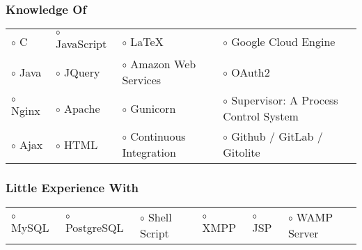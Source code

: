 \documentclass[12pt]{article}
\begin{document}
\subsubsection*{Knowledge Of}

\begin{tabular}{l l l l}
 $\circ$ C &
 $\circ$ JavaScript &
 $\circ$ \LaTeX{} &
 $\circ$ Google Cloud Engine \\
 $\circ$ Java &
 $\circ$ JQuery &
 $\circ$ Amazon Web Services &
 $\circ$ OAuth2 \\
 $\circ$ Nginx &
 $\circ$ Apache &
 $\circ$ Gunicorn &
 $\circ$ Supervisor: A Process Control System \\
 $\circ$ Ajax &
 $\circ$ HTML &
 $\circ$ Continuous Integration &
 $\circ$ Github / GitLab / Gitolite \\
\end{tabular}

\subsubsection*{Little Experience With}

\begin{tabular}{l l l l l l}
 $\circ$ MySQL &
 $\circ$ PostgreSQL &
 $\circ$ Shell Script &
 $\circ$ XMPP &
 $\circ$ JSP &
 $\circ$ WAMP Server \\
\end{tabular}
\end{document}
